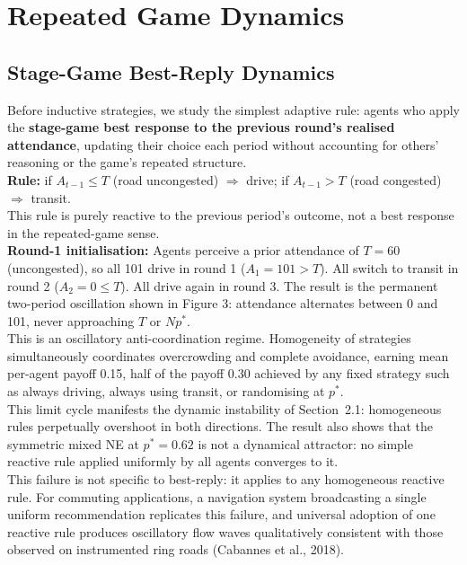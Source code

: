 \section{Repeated Game Dynamics}

\subsection{Stage-Game Best-Reply Dynamics}

Before inductive strategies, we study the simplest adaptive rule: agents who apply the \textbf{stage-game best response to the previous round's realised attendance}, updating their choice each period without accounting for others' reasoning or the game's repeated structure. \\

\textbf{Rule:} if $A_{t-1} \leq T$ (road uncongested) $\Rightarrow$ drive; if $A_{t-1} > T$ (road congested) $\Rightarrow$ transit. \\

This rule is purely reactive to the previous period's outcome, not a best response in the repeated-game sense.\\

\textbf{Round-1 initialisation:} Agents perceive a prior attendance of $T = 60$ (uncongested), so all 101 drive in round 1 ($A_1 = 101 > T$). All switch to transit in round 2 ($A_2 = 0 \leq T$). All drive again in round 3. The result is the permanent two-period oscillation shown in Figure 3: attendance alternates between 0 and 101, never approaching $T$ or $Np^*$. \\

This is an oscillatory anti-coordination regime. Homogeneity of strategies simultaneously coordinates overcrowding and complete avoidance, earning mean per-agent payoff 0.15, half of the payoff 0.30 achieved by any fixed strategy such as always driving, always using transit, or randomising at $p^*$. \\

This limit cycle manifests the dynamic instability of Section~2.1: homogeneous rules perpetually overshoot in both directions. The result also shows that the symmetric mixed NE at $p^* = 0.62$ is not a dynamical attractor: no simple reactive rule applied uniformly by all agents converges to it. \\

This failure is not specific to best-reply: it applies to any homogeneous reactive rule. For commuting applications, a navigation system broadcasting a single uniform recommendation replicates this failure, and universal adoption of one reactive rule produces oscillatory flow waves qualitatively consistent with those observed on instrumented ring roads (Cabannes et al., 2018). \\

